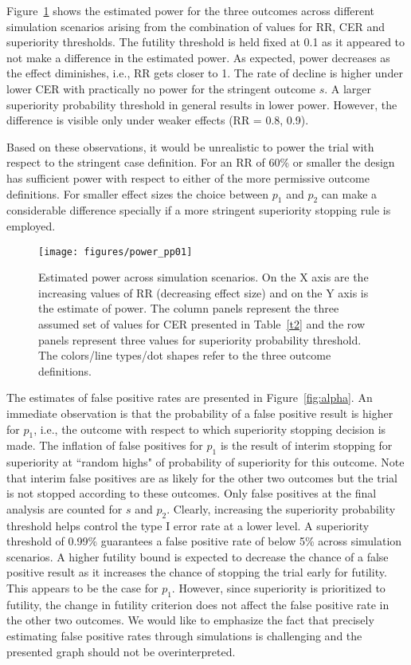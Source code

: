 \documentclass[12pt]{article}
\begin{document}
Figure~\ref{fig:power} shows the estimated power for the three outcomes across different simulation scenarios arising from the combination of values for RR, CER and superiority thresholds. The futility threshold is held fixed at 0.1 as it appeared to not make a difference in the estimated power. As expected, power decreases as the effect diminishes, i.e., RR gets closer to 1. The rate of decline is higher under lower CER with practically no power for the stringent outcome $s$. A larger superiority probability threshold in general results in lower power. However, the difference is visible only under weaker effects (RR = 0.8, 0.9).

Based on these observations, it would be unrealistic to power the trial with respect to the stringent case definition. For an RR of 60\% or smaller the design has sufficient power with respect to either of the more permissive outcome definitions. For smaller effect sizes the choice between $p_1$ and $p_2$ can make a considerable difference specially if a more stringent superiority stopping rule is employed.

\begin{figure}[t]

		\centering
		\texttt{[image: figures/power\_pp01]}
		\caption{Estimated power across simulation scenarios. On the X axis are the increasing values of RR (decreasing effect size) and on the Y axis is the estimate of power. The column panels represent the three assumed set of values for CER presented in Table~\ref{t2} and the row panels represent three values for superiority probability threshold. The colors/line types/dot shapes refer to the three outcome definitions.}
		\label{fig:power}

\end{figure}

The estimates of false positive rates are presented in Figure~\ref{fig:alpha}. An immediate observation is that the probability of a false positive result is higher for $p_1$, i.e., the outcome with respect to which superiority stopping decision is made. The inflation of false positives for $p_1$ is the result of interim stopping for superiority at ``random highs" of probability of superiority for this outcome. Note that interim false positives are as likely for the other two outcomes but the trial is not stopped according to these outcomes. Only false positives at the final analysis are counted for $s$ and $p_2$. Clearly, increasing the superiority probability threshold helps control the type I error rate at a lower level. A superiority threshold of 0.99\% guarantees a false positive rate of below 5\% across simulation scenarios. A higher futility bound is expected to decrease the chance of a false positive result as it increases the chance of stopping the trial early for futility. This appears to be the case for $p_1$. However, since superiority is prioritized to futility, the change in futility criterion does not affect the false positive rate in the other two outcomes. We would like to emphasize the fact that precisely estimating false positive rates through simulations is challenging and the presented graph should not be overinterpreted. 
\end{document}
